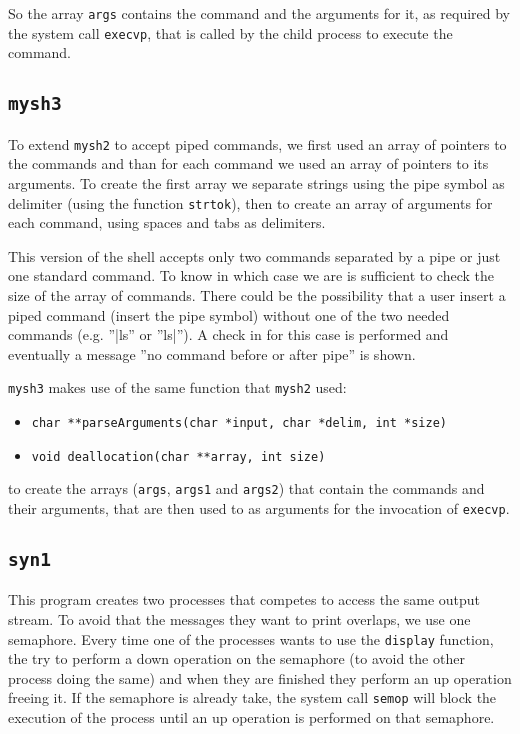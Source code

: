 So the array \texttt{args} contains the command and the arguments for it, as required by the system call \texttt{execvp}, that is called by the child process to execute the command.

\subsection{\texttt{mysh3}}
To extend \texttt{mysh2} to accept piped commands, we first used an array of pointers to the commands and than for each command we used an array of pointers to its arguments. To create the first array we separate strings using the pipe symbol as delimiter (using the function \texttt{strtok}), then to create an array of arguments for each command, using spaces and tabs as delimiters.  \newline

This version of the shell accepts only two commands separated by a pipe or just one standard command. To know in which case we are is sufficient to check the size of the array of commands. There could be the possibility that a user insert a piped command (insert the pipe symbol) without one of the two needed commands (e.g. ''|ls'' or ''ls|''). A check in for this case is performed and eventually a message ''no command before or after pipe'' is shown.\newline

\texttt{mysh3} makes use of the same function that \texttt{mysh2} used:
\begin{itemize}
\item{\texttt{char **parseArguments(char *input, char *delim, int *size)}}
\item{\texttt{void deallocation(char **array, int size)}}
\end{itemize}
to create the arrays (\texttt{args}, \texttt{args1} and \texttt{args2}) that contain the commands and their arguments, that are then used to as arguments for the invocation of \texttt{execvp}.


\subsection{\texttt{syn1}}
This program creates two processes that competes to access the same output stream. To avoid that the messages they want to print overlaps, we use one semaphore. Every time one of the processes wants to use the \texttt{display} function, the try to perform a down operation on the semaphore (to avoid the other process doing the same) and when they are finished they perform an up operation freeing it. If the semaphore is already take, the system call \texttt{semop} will block the execution of the process until an up operation is performed on that semaphore.
